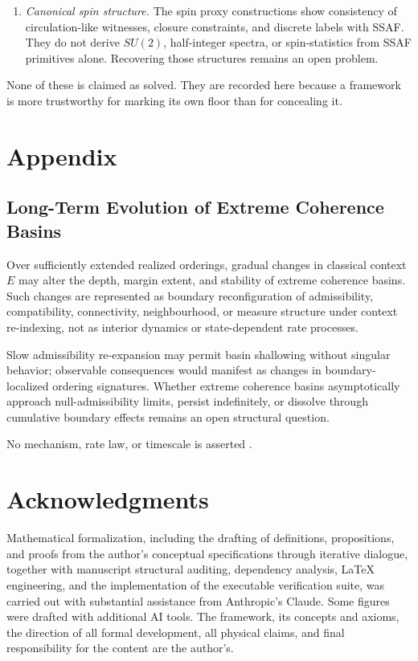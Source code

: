 \documentclass[aps,prx,onecolumn,11pt]{revtex4-2}
\theoremstyle{plain}
\theoremstyle{definition}
\theoremstyle{remark}
\begin{document}
\begin{enumerate}[label=(\roman*), leftmargin=2.2em]
\item \emph{Canonical spin structure.}
The spin proxy constructions show consistency of circulation-like
witnesses, closure constraints, and discrete labels with SSAF. They do
not derive \(SU(2)\), half-integer spectra, or spin-statistics from
SSAF primitives alone. Recovering those structures remains an open
problem.

\end{enumerate}

None of these is claimed as solved. They are recorded here because a
framework is more trustworthy for marking its own floor than for
concealing it.

\clearpage

\section{Appendix}
\label{sec:appendix}

\subsection{Long-Term Evolution of Extreme Coherence Basins}
\label{subsec:basin_evolution}

Over sufficiently extended realized orderings, gradual changes in
classical context \(E\) may alter the depth, margin extent, and
stability of extreme coherence basins. Such changes are represented as
boundary reconfiguration of admissibility, compatibility, connectivity,
neighbourhood, or measure structure under context re-indexing, not as
interior dynamics or state-dependent rate processes.

Slow admissibility re-expansion may permit basin shallowing without
singular behavior; observable consequences would manifest as changes in
boundary-localized ordering signatures. Whether extreme coherence
basins asymptotically approach null-admissibility limits, persist
indefinitely, or dissolve through cumulative boundary effects remains an
open structural question.

No mechanism, rate law, or timescale is asserted
\cite{Lindblad1976,Gorini1976,BreuerPetruccione2002,Watrous2018}.

\section*{Acknowledgments}

Mathematical formalization, including the drafting of definitions,
propositions, and proofs from the author's conceptual specifications
through iterative dialogue, together with manuscript structural
auditing, dependency analysis, LaTeX engineering, and the
implementation of the executable verification suite, was carried out
with substantial assistance from Anthropic's Claude. Some figures were
drafted with additional AI tools. The framework, its concepts and
axioms, the direction of all formal development, all physical claims,
and final responsibility for the content are the author's.
\end{document}
